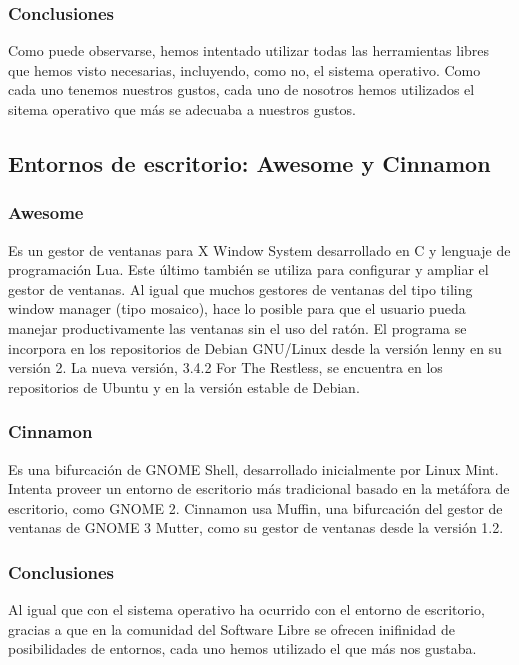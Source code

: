 \documentclass[12pt,a4paper]{report}
\begin{document}
\subsubsection{Conclusiones}

Como puede observarse, hemos intentado utilizar todas las herramientas libres
que hemos visto necesarias, incluyendo, como no, el sistema operativo. Como cada uno
tenemos nuestros gustos, cada uno de nosotros hemos utilizados el sitema
operativo que más se adecuaba a nuestros gustos. 


\subsection{Entornos de escritorio: Awesome y Cinnamon}

\subsubsection{Awesome}

Es un gestor de ventanas para X Window System desarrollado en C y lenguaje de
programación Lua. Este último también se utiliza para configurar y ampliar el
gestor de ventanas. Al igual que muchos gestores de ventanas del tipo tiling
window manager (tipo mosaico), hace lo posible para que el usuario pueda manejar
productivamente las ventanas sin el uso del ratón.  El programa se incorpora en
los repositorios de Debian GNU/Linux desde la versión lenny en su versión 2. La
nueva versión, 3.4.2 For The Restless, se encuentra en los repositorios de
Ubuntu y en la versión estable de Debian.

\subsubsection{Cinnamon}

Es una bifurcación de GNOME Shell, desarrollado inicialmente por Linux Mint.
Intenta proveer un entorno de escritorio más tradicional basado en la metáfora
de escritorio, como GNOME 2. Cinnamon usa Muffin, una bifurcación del gestor de
ventanas de GNOME 3 Mutter, como su gestor de ventanas desde la versión 1.2.

\subsubsection{Conclusiones}

Al igual que con el sistema operativo ha ocurrido con el entorno de escritorio,
gracias a que en la comunidad del Software Libre se ofrecen inifinidad de
posibilidades de entornos, cada uno hemos utilizado el que más nos gustaba.
\end{document}
